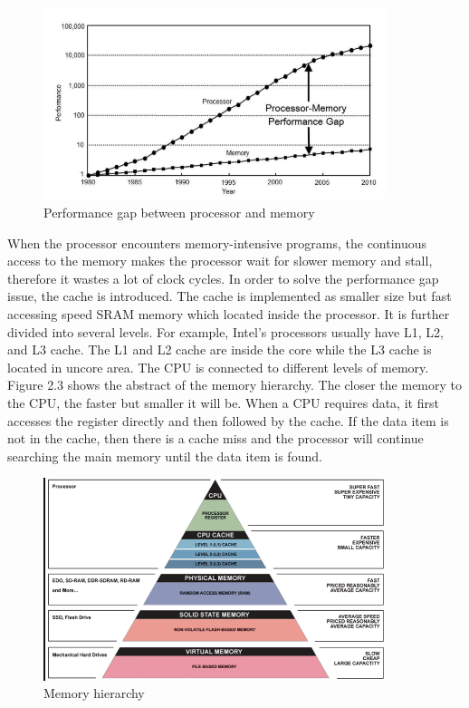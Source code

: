 \begin{figure} [h] %
	\centering   %
	\includegraphics[width=10cm]{pictures/fig2.4}
	\caption{Performance gap between processor and memory \cite{9}}
	\label{fig1}  %
\end{figure}

When the processor encounters memory-intensive programs, the continuous access to the memory makes the processor wait for slower memory and stall, therefore it wastes a lot of clock cycles. In order to solve the performance gap issue, the cache is introduced. The cache is implemented as smaller size but fast accessing speed SRAM memory which located inside the processor. It is further divided into several levels. For example, Intel's processors usually have L1, L2, and L3 cache. The L1 and L2 cache are inside the core while the L3 cache is located in uncore area. The CPU is connected to different levels of memory. Figure 2.3 \cite{11} shows the abstract of the memory hierarchy. The closer the memory to the CPU, the faster but smaller it will be. When a CPU requires data, it first accesses the register directly and then followed by the cache. If the data item is not in the cache, then there is a cache miss and the processor will continue searching the main memory until the data item is found.			
	
\begin{figure} [h] %
	\centering   %
	\includegraphics[width=10cm]{pictures/fig2.5}
	\caption{Memory hierarchy \cite{11}}
	\label{fig1}  %
\end{figure}

